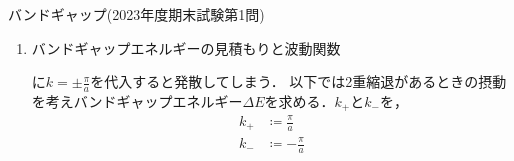 \documentclass{report}
\begin{document}
\begin{myex}{バンドギャップ(2023年度期末試験第1問)}{}
\begin{enumerate}
        \begin{enumerate}
          \item 第1 Brillouinゾーン内側$\qty(k < \frac{\pi}{a})$の振る舞い\par
            $\epsilon^{(0)}(k)$は放物線なので，
            \begin{align}
              \begin{dcases}
                \epsilon^{(0)}(k) \ll \epsilon^{(0)}(k + g) \\
                \epsilon^{(0)}(k) < \epsilon^{(0)}(k - g)
              \end{dcases}
            \end{align}
            が成立する．
            よって，の第2項が0に，第3項が負になるので，$E(k) < \epsilon^{(0)}(k)$が成り立つ．
            つまり，摂動が加わった後のエネルギーは加わる前のエネルギーより小さくなる．
          \item 第1 Brillouinゾーン外側$\qty(k > \frac{\pi}{a})$の振る舞い\par
            第1 Brillouinゾーン内側のときと同様に考えると，
            \begin{align}
              \begin{dcases}
                \epsilon^{(0)}(k) \ll \epsilon^{(0)}(k + g)\\
                \epsilon^{(0)}(k) > \epsilon^{(0)}(k - g)
              \end{dcases}
            \end{align}
            が成立する．
            よって，の第2項が0に，第3項が正になるので，$E(k) > \epsilon^{(0)}(k)$が成り立つ．
            つまり，摂動が加わった後のエネルギーは加わる前のエネルギーより大きくなる．
        \end{enumerate}
        以上の議論により，結晶中の周期ポテンシャルによりバンドギャップが形成されることがわかった．
      \item バンドギャップエネルギーの見積もりと波動関数\par
        に$k = \pm\frac{\pi}{a}$を代入すると発散してしまう．
        以下では2重縮退があるときの摂動を考えバンドギャップエネルギー$\Delta E$を求める．$k_+$と$k_-$を，
        \begin{align}
          k_+ &\coloneqq \frac{\pi}{a} \\ 
          k_- &\coloneqq -\frac{\pi}{a}
        \end{align}

\end{enumerate}
\end{myex}
\end{document}
